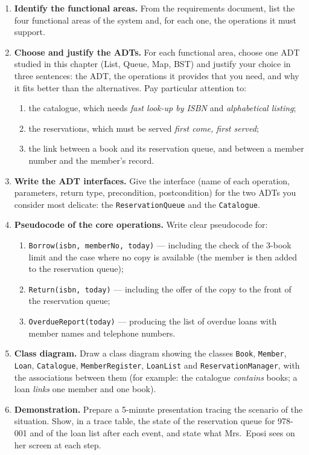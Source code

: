 \documentclass[11pt]{article}
\begin{document}
\begin{enumerate}
\item \textbf{Identify the functional areas.} From the requirements document, list the four functional areas of the system and, for each one, the operations it must support.

\item \textbf{Choose and justify the ADTs.} For each functional area, choose one ADT studied in this chapter (List, Queue, Map, BST) and justify your choice in three sentences: the ADT, the operations it provides that you need, and why it fits better than the alternatives. Pay particular attention to:
\begin{enumerate}
\item the catalogue, which needs \emph{fast look-up by ISBN} and \emph{alphabetical listing};
\item the reservations, which must be served \emph{first come, first served};
\item the link between a book and its reservation queue, and between a member number and the member's record.
\end{enumerate}

\item \textbf{Write the ADT interfaces.} Give the interface (name of each operation, parameters, return type, precondition, postcondition) for the two ADTs you consider most delicate: the \texttt{ReservationQueue} and the \texttt{Catalogue}.

\item \textbf{Pseudocode of the core operations.} Write clear pseudocode for:
\begin{enumerate}
\item \texttt{Borrow(isbn, memberNo, today)} — including the check of the 3-book limit and the case where no copy is available (the member is then added to the reservation queue);
\item \texttt{Return(isbn, today)} — including the offer of the copy to the front of the reservation queue;
\item \texttt{OverdueReport(today)} — producing the list of overdue loans with member names and telephone numbers.
\end{enumerate}

\item \textbf{Class diagram.} Draw a class diagram showing the classes \texttt{Book}, \texttt{Member}, \texttt{Loan}, \texttt{Catalogue}, \texttt{MemberRegister}, \texttt{LoanList} and \texttt{ReservationManager}, with the associations between them (for example: the catalogue \emph{contains} books; a loan \emph{links} one member and one book).

\item \textbf{Demonstration.} Prepare a 5-minute presentation tracing the scenario of the situation. Show, in a trace table, the state of the reservation queue for 978-001 and of the loan list after each event, and state what Mrs.\ Eposi sees on her screen at each step.
\end{enumerate}
\end{document}

